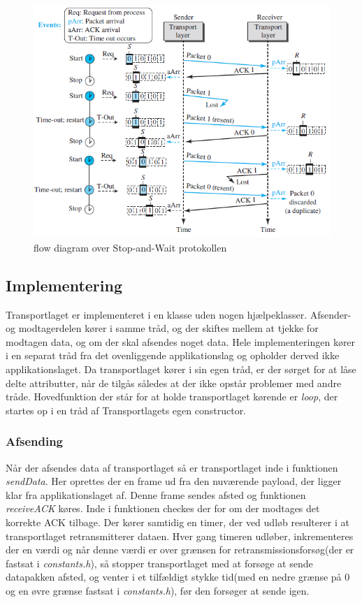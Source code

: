 \begin{figure}[h]
\centering
\includegraphics[scale=0.75]{Billeder/StopAndWaitFlow.png}
\caption{flow diagram over Stop-and-Wait protokollen
\label{StopAndWaitFlow}}
\end{figure}

\subsection{Implementering}
Transportlaget er implementeret i en klasse uden nogen hjælpeklasser. Afsender-og modtagerdelen kører i samme tråd, og der skiftes mellem at tjekke for modtagen data, og om der skal afsendes noget data. Hele implementeringen kører i en separat tråd fra det ovenliggende applikationslag og opholder derved ikke applikationslaget. Da transportlaget kører i sin egen tråd, er der sørget for at låse delte attributter, når de tilgås således at der ikke opstår problemer med andre tråde. Hovedfunktion der står for at holde transportlaget kørende er \textit{loop}, der startes op i en tråd af Transportlagets egen constructor.

\subsubsection{Afsending}
Når der afsendes data af transportlaget så er transportlaget inde i funktionen \textit{sendData}. Her oprettes der en frame ud fra den nuværende payload, der ligger klar fra applikationslaget af. Denne frame sendes afsted og funktionen \textit{receiveACK} køres. Inde i funktionen checkes der for om der modtages det korrekte ACK tilbage. Der kører samtidig en timer, der ved udløb resulterer i at transportlaget retransmitterer dataen. Hver gang timeren udløber, inkrementeres der en værdi og når denne værdi er over grænsen for retransmissionsforsøg(der er fastsat i \textit{constants.h}), så stopper transportlaget med at forsøge at sende datapakken afsted, og venter i et tilfældigt stykke tid(med en nedre grænse på 0 og en øvre grænse fastsat i \textit{constants.h}), før den forsøger at sende igen.


